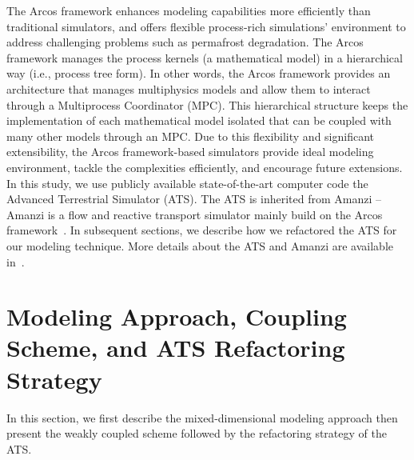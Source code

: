 \documentclass[review]{elsarticle}
\begin{document}
The Arcos framework enhances modeling capabilities more efficiently than traditional simulators, and offers flexible process-rich simulations' environment to address challenging problems such as permafrost degradation. The Arcos framework manages the process kernels (a mathematical model) in a hierarchical way (i.e., process tree form). In other words, the Arcos framework provides an architecture that manages multiphysics models and allow them to interact through a Multiprocess Coordinator (MPC). This hierarchical structure keeps the implementation of each mathematical model isolated that can be coupled with many other models through an MPC. Due to this flexibility and significant extensibility, the Arcos framework-based simulators provide ideal modeling environment, tackle the complexities efficiently, and encourage future extensions. 
In this study, we use publicly available state-of-the-art computer code the Advanced Terrestrial Simulator (ATS). The ATS is inherited from Amanzi -- Amanzi is a flow and reactive transport simulator mainly build on the Arcos framework~\cite{moulton2012high}. In subsequent sections, we describe how we refactored the ATS for our modeling technique. More details about the ATS and Amanzi are available in~\cite{ecoon2016managing, moulton2012high, spainter2016integrated}.


\section{Modeling Approach, Coupling Scheme, and ATS Refactoring Strategy}\label{mixed-dim-model}

In this section, we first describe the mixed-dimensional modeling approach then present the weakly coupled scheme followed by the refactoring strategy of the ATS.
\end{document}
